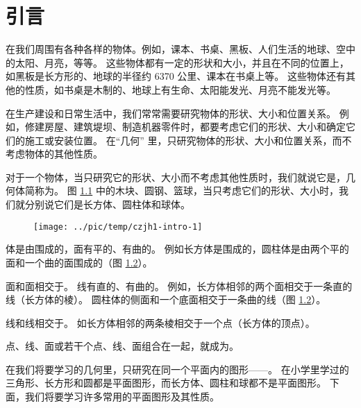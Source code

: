 \chapter{引言}

在我们周围有各种各样的物体。例如，课本、书桌、黑板、人们生活的地球、空中的太阳、月亮，等等。
这些物体都有一定的形状和大小，并且在不同的位置上，如黑板是长方形的、地球的半径约 6370 公里、课本在书桌上等。
这些物体还有其他的性质，如书桌是木制的、地球上有生命、太阳能发光、月亮不能发光等。

在生产建设和日常生活中，我们常常需要研究物体的形状、大小和位置关系。
例如，修建房屋、建筑堤坝、制造机器零件时，都要考虑它们的形状、大小和确定它们的施工或安装位置。
在“几何” \footnotemark 里，只研究物体的形状、大小和位置关系，而不考虑物体的其他性质。

对于一个物体，当只研究它的形状、大小而不考虑其他性质时，我们就说它是，几何体简称为。
图 \ref{fig:czjh1-intro-1} 中的木块、圆钢、篮球，当只考虑它们的形状、大小时，我们就分别说它们是长方体、圆柱体和球体。

\begingroup
\renewcommand{\thefigure}{\arabic{figure}\;}

\begin{figure}[htbp]
    \centering
    \texttt{[image: ../pic/temp/czjh1-intro-1]}
    \caption{}\label{fig:czjh1-intro-1}
\end{figure}

体是由围成的，面有平的、有曲的。
例如长方体是围成的，圆柱体是由两个平的面和一个曲的面围成的（图 \ref{fig:czjh1-intro-2}）。

\begin{figure}[htbp]
    \centering
    
    \caption{}\label{fig:czjh1-intro-2}
\end{figure}

\endgroup

面和面相交于。 线有直的、有曲的。
例如，长方体相邻的两个面相交于一条直的线（长方体的棱）。
圆柱体的侧面和一个底面相交于一条曲的线（图 \ref{fig:czjh1-intro-2}）。

线和线相交于。
如长方体相邻的两条棱相交于一个点（长方体的顶点）。

点、线、面或若干个点、线、面组合在一起，就成为。

在我们将要学习的几何里，只研究在同一个平面内的图形——。
在小学里学过的三角形、长方形和圆都是平面图形，而长方体、圆柱和球都不是平面图形。
下面，我们将要学习许多常用的平面图形及其性质。


